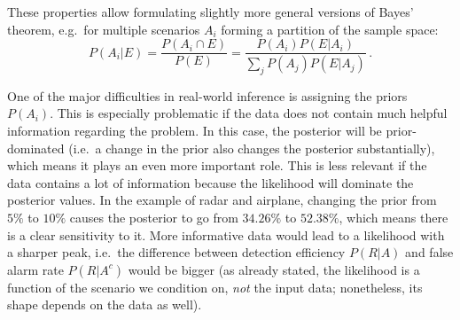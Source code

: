 These properties allow formulating slightly more general versions of Bayes' theorem, e.g.~for multiple scenarios $A_i$ forming a partition of the sample space:
\begin{equation}\label{eq:bayes_events_general}
P(A_i | E) = \frac{P(A_i \cap E)}{P(E)} = \frac{P(A_i) P(E | A_i)}{\sum_j P(A_j) P(E | A_j)} \, .
\end{equation}

One of the major difficulties in real-world inference is assigning the priors $P(A_i)$. This is especially problematic if the data does not contain much helpful information regarding the problem. In this case, the posterior will be prior-dominated (i.e.~a change in the prior also changes the posterior substantially), which means it plays an even more important role. This is less relevant if the data contains a lot of information because the likelihood will dominate the posterior values. In the example of radar and airplane, changing the prior from $5\%$ to $10\%$ causes the posterior to go from $34.26\%$ to $52.38\%$, which means there is a clear sensitivity to it. More informative data would lead to a likelihood with a sharper peak, i.e.~the difference between detection efficiency $P(R | A)$ and false alarm rate $P(R | A^c)$ would be bigger (as already stated, the likelihood is a function of the scenario we condition on, \emph{not} the input data; nonetheless, its shape depends on the data as well).





